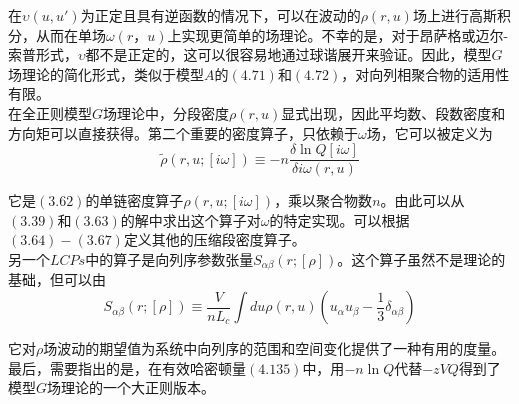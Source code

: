 在$\upsilon(u,u')$为正定且具有逆函数的情况下，可以在波动的$\rho(r,u)$场上进行高斯积分，从而在单场$\omega(r，u)$上实现更简单的场理论。不幸的是，对于昂萨格或迈尔-索普形式，$\upsilon$都不是正定的，这可以很容易地通过球谐展开来验证。因此，模型$G$场理论的简化形式，类似于模型$A$的$(4.71)$和$(4.72)$，对向列相聚合物的适用性有限。\\

在全正则模型$G$场理论中，分段密度$\rho(r,u)$显式出现，因此平均数、段数密度和方向矩可以直接获得。第二个重要的密度算子，只依赖于$\omega$场，它可以被定义为\\
\begin{equation}
\tilde{\rho}(r,u;[i \omega]) \equiv -n \frac{\delta \ln Q[i \omega]}{\delta i \omega(r,u)}
\end{equation}

它是$(3.62)$的单链密度算子$\rho(r,u;[i \omega])$，乘以聚合物数$n$。由此可以从$(3.39)$和$(3.63)$的解中求出这个算子对$\omega$的特定实现。可以根据$(3.64)-(3.67)$定义其他的压缩段密度算子。\\

另一个$LCPs$中的算子是向列序参数张量$S_{\alpha \beta}(r;[\rho])$。这个算子虽然不是理论的基础，但可以由\\
\begin{equation}
S_{\alpha \beta}(r;[\rho]) \equiv \frac{V}{n L_{c}} \int du \rho(r,u)(u_{\alpha} u_{\beta}-\frac{1}{3} \delta_{\alpha \beta})
\end{equation}

它对$\rho$场波动的期望值为系统中向列序的范围和空间变化提供了一种有用的度量。最后，需要指出的是，在有效哈密顿量$(4.135)$中，用$-n \ln Q$代替$-z VQ$得到了模型$G$场理论的一个大正则版本。\\